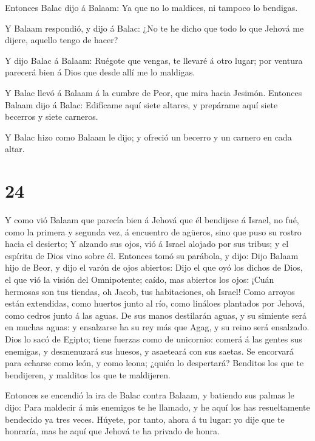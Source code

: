  Entonces Balac dijo á Balaam: Ya que no lo maldices, ni
tampoco lo bendigas.

 Y Balaam respondió, y dijo á Balac: ¿No te he dicho que
todo lo que Jehová me dijere, aquello tengo de hacer?

 Y dijo Balac á Balaam: Ruégote que vengas, te llevaré á
otro lugar; por ventura parecerá bien á Dios que desde allí me lo
maldigas.

 Y Balac llevó á Balaam á la cumbre de Peor, que mira hacia
Jesimón.  Entonces Balaam dijo á Balac: Edifícame aquí
siete altares, y prepárame aquí siete becerros y siete carneros.

 Y Balac hizo como Balaam le dijo; y ofreció un becerro y
un carnero en cada altar.

\hypertarget{section-23}{%
\section{24}\label{section-23}}

 Y como vió Balaam que parecía bien á Jehová que él
bendijese á Israel, no fué, como la primera y segunda vez, á encuentro
de agüeros, sino que puso su rostro hacia el desierto;  Y
alzando sus ojos, vió á Israel alojado por sus tribus; y el espíritu de
Dios vino sobre él.  Entonces tomó su parábola, y dijo: Dijo
Balaam hijo de Beor, y dijo el varón de ojos abiertos:  Dijo
el que oyó los dichos de Dios, el que vió la visión del Omnipotente;
caído, mas abiertos los ojos:  ¡Cuán hermosas son tus
tiendas, oh Jacob, tus habitaciones, oh Israel!  Como
arroyos están extendidas, como huertos junto al río, como lináloes
plantados por Jehová, como cedros junto á las aguas.  De sus
manos destilarán aguas, y su simiente será en muchas aguas: y ensalzarse
ha su rey más que Agag, y su reino será ensalzado.  Dios lo
sacó de Egipto; tiene fuerzas como de unicornio: comerá á las gentes sus
enemigas, y desmenuzará sus huesos, y asaeteará con sus saetas.
 Se encorvará para echarse como león, y como leona; ¿quién
lo despertará? Benditos los que te bendijeren, y malditos los que te
maldijeren.

 Entonces se encendió la ira de Balac contra Balaam, y
batiendo sus palmas le dijo: Para maldecir á mis enemigos te he llamado,
y he aquí los has resueltamente bendecido ya tres veces. 
Húyete, por tanto, ahora á tu lugar: yo dije que te honraría, mas he
aquí que Jehová te ha privado de honra.

